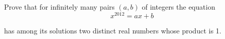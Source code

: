 Prove that for infinitely many pairs $(a,b)$ of integers the equation\[x^{2012} = ax + b\]

has among its solutions two distinct real numbers whose product is 1.